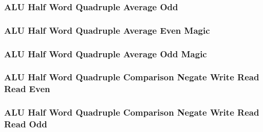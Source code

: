

\subsubsection[{\small ALU Half Word Quadruple Average Odd}]{ALU Half Word Quadruple Average Odd} \label{sec:format-ALU-HQAVGO}



\subsubsection[{\small ALU Half Word Quadruple Average Even Magic}]{ALU Half Word Quadruple Average Even Magic} \label{sec:format-ALU-HQAVGE.M}



\subsubsection[{\small ALU Half Word Quadruple Average Odd Magic}]{ALU Half Word Quadruple Average Odd Magic} \label{sec:format-ALU-HQAVGO.M}



\subsubsection[{\small ALU Half Word Quadruple Comparison Negate Write Read Read Even}]{ALU Half Word Quadruple Comparison Negate Write Read Read Even} \label{sec:format-ALU-HQCNWRRE}



\subsubsection[{\small ALU Half Word Quadruple Comparison Negate Write Read Read Odd}]{ALU Half Word Quadruple Comparison Negate Write Read Read Odd} \label{sec:format-ALU-HQCNWRRO}

